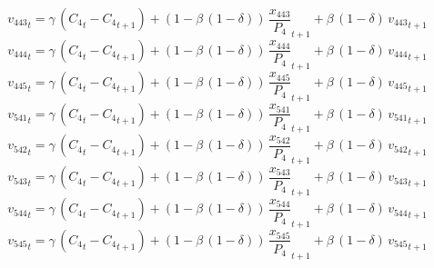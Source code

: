 \begin{dmath}
{{v_{443}}}_{t}={{\gamma}}\, \left({{C_{4}}}_{t}-{{C_{4}}}_{t+1}\right)+\left(1-{{\beta}}\, \left(1-{{\delta}}\right)\right)\, {{\frac{x_{443}}{P_{4}}}}_{t+1}+{{\beta}}\, \left(1-{{\delta}}\right)\, {{v_{443}}}_{t+1}
\end{dmath}
\begin{dmath}
{{v_{444}}}_{t}={{\gamma}}\, \left({{C_{4}}}_{t}-{{C_{4}}}_{t+1}\right)+\left(1-{{\beta}}\, \left(1-{{\delta}}\right)\right)\, {{\frac{x_{444}}{P_{4}}}}_{t+1}+{{\beta}}\, \left(1-{{\delta}}\right)\, {{v_{444}}}_{t+1}
\end{dmath}
\begin{dmath}
{{v_{445}}}_{t}={{\gamma}}\, \left({{C_{4}}}_{t}-{{C_{4}}}_{t+1}\right)+\left(1-{{\beta}}\, \left(1-{{\delta}}\right)\right)\, {{\frac{x_{445}}{P_{4}}}}_{t+1}+{{\beta}}\, \left(1-{{\delta}}\right)\, {{v_{445}}}_{t+1}
\end{dmath}
\begin{dmath}
{{v_{541}}}_{t}={{\gamma}}\, \left({{C_{4}}}_{t}-{{C_{4}}}_{t+1}\right)+\left(1-{{\beta}}\, \left(1-{{\delta}}\right)\right)\, {{\frac{x_{541}}{P_{4}}}}_{t+1}+{{\beta}}\, \left(1-{{\delta}}\right)\, {{v_{541}}}_{t+1}
\end{dmath}
\begin{dmath}
{{v_{542}}}_{t}={{\gamma}}\, \left({{C_{4}}}_{t}-{{C_{4}}}_{t+1}\right)+\left(1-{{\beta}}\, \left(1-{{\delta}}\right)\right)\, {{\frac{x_{542}}{P_{4}}}}_{t+1}+{{\beta}}\, \left(1-{{\delta}}\right)\, {{v_{542}}}_{t+1}
\end{dmath}
\begin{dmath}
{{v_{543}}}_{t}={{\gamma}}\, \left({{C_{4}}}_{t}-{{C_{4}}}_{t+1}\right)+\left(1-{{\beta}}\, \left(1-{{\delta}}\right)\right)\, {{\frac{x_{543}}{P_{4}}}}_{t+1}+{{\beta}}\, \left(1-{{\delta}}\right)\, {{v_{543}}}_{t+1}
\end{dmath}
\begin{dmath}
{{v_{544}}}_{t}={{\gamma}}\, \left({{C_{4}}}_{t}-{{C_{4}}}_{t+1}\right)+\left(1-{{\beta}}\, \left(1-{{\delta}}\right)\right)\, {{\frac{x_{544}}{P_{4}}}}_{t+1}+{{\beta}}\, \left(1-{{\delta}}\right)\, {{v_{544}}}_{t+1}
\end{dmath}
\begin{dmath}
{{v_{545}}}_{t}={{\gamma}}\, \left({{C_{4}}}_{t}-{{C_{4}}}_{t+1}\right)+\left(1-{{\beta}}\, \left(1-{{\delta}}\right)\right)\, {{\frac{x_{545}}{P_{4}}}}_{t+1}+{{\beta}}\, \left(1-{{\delta}}\right)\, {{v_{545}}}_{t+1}
\end{dmath}
